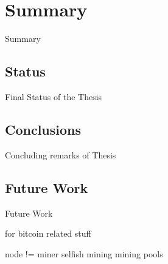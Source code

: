 \chapter{Summary} \label{chapter:summary}

Summary

\section{Status} 
\label{sec:status}

Final Status of the Thesis

\section{Conclusions}
\label{sec:conclusions}

Concluding remarks of Thesis

\section{Future Work} 
\label{sec:futureWork}

Future Work

for bitcoin related stuff

node != miner
selfish mining
mining pools